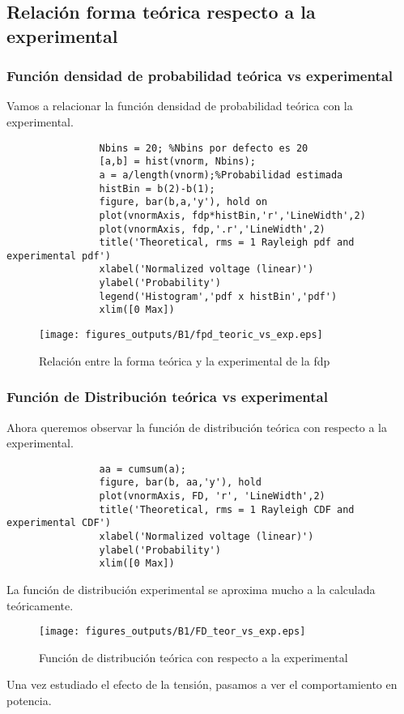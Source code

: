 \documentclass{article}
\begin{document}
    \subsection{Relación forma teórica respecto a la experimental}
        \subsubsection{Función densidad de probabilidad teórica vs experimental}
            \par Vamos a relacionar la función densidad de probabilidad teórica con la experimental.
            \begin{lstlisting}
                Nbins = 20; %Nbins por defecto es 20
                [a,b] = hist(vnorm, Nbins);
                a = a/length(vnorm);%Probabilidad estimada
                histBin = b(2)-b(1);
                figure, bar(b,a,'y'), hold on
                plot(vnormAxis, fdp*histBin,'r','LineWidth',2)
                plot(vnormAxis, fdp,'.r','LineWidth',2)
                title('Theoretical, rms = 1 Rayleigh pdf and experimental pdf')
                xlabel('Normalized voltage (linear)')
                ylabel('Probability')
                legend('Histogram','pdf x histBin','pdf')
                xlim([0 Max])
            \end{lstlisting}
            \begin{figure}[h]
                \centering
                \texttt{[image: figures\_outputs/B1/fpd\_teoric\_vs\_exp.eps]}
                \caption{Relación entre la forma teórica y la experimental de la fdp }
                \label{fig:fdp_teor_vs_exp}
            \end{figure}
        \subsubsection{Función de Distribución teórica vs experimental}
            \par Ahora queremos observar la función de distribución teórica con respecto a la experimental.
            \begin{lstlisting}
                aa = cumsum(a);
                figure, bar(b, aa,'y'), hold
                plot(vnormAxis, FD, 'r', 'LineWidth',2)
                title('Theoretical, rms = 1 Rayleigh CDF and experimental CDF')
                xlabel('Normalized voltage (linear)')
                ylabel('Probability')
                xlim([0 Max])
            \end{lstlisting}
            \par La función de distribución experimental se aproxima mucho a la calculada teóricamente.
            \begin{figure}[h]
                \centering
                \texttt{[image: figures\_outputs/B1/FD\_teor\_vs\_exp.eps]}
                \caption{Función de distribución teórica con respecto a la experimental}
                \label{fig:FD_teór_vs_exp}
            \end{figure}
            \par Una vez estudiado el efecto de la tensión, pasamos a ver el comportamiento en potencia.
\end{document}
